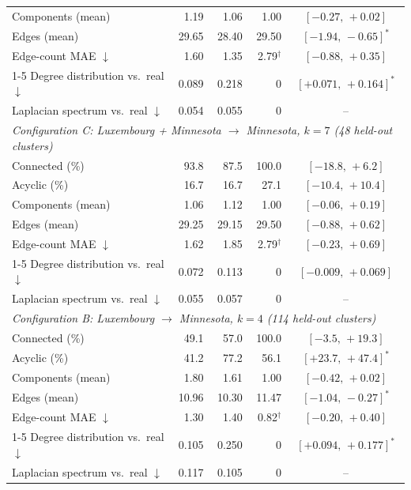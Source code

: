 \begin{table}[t]
\begin{tabular}{lrrrc}
Components (mean)                              &    1.19 &    1.06 &      1.00 & $[-0.27,\,+0.02]$ \\
Edges (mean)                                   &   29.65 &   28.40 &     29.50 & $[-1.94,\,-0.65]^\ast$ \\
Edge-count MAE $\downarrow$                    &    1.60 &    1.35 & 2.79$^\dagger$ & $[-0.88,\,+0.35]$ \\
\cmidrule(lr){1-5}
Degree distribution vs.\ real $\downarrow$     &   0.089 &   0.218 &         0 & $[+0.071,\,+0.164]^\ast$ \\
Laplacian spectrum vs.\ real $\downarrow$      &   0.054 &   0.055 &         0 & -- \\
\midrule
\multicolumn{5}{l}{\emph{Configuration C: Luxembourg + Minnesota $\rightarrow$ Minnesota, $k = 7$ (48 held-out clusters)}} \\
\midrule
Connected (\%)                                 &    93.8 &    87.5 &     100.0 & $[-18.8,\,+6.2]$ \\
Acyclic (\%)                                   &    16.7 &    16.7 &      27.1 & $[-10.4,\,+10.4]$ \\
Components (mean)                              &    1.06 &    1.12 &      1.00 & $[-0.06,\,+0.19]$ \\
Edges (mean)                                   &   29.25 &   29.15 &     29.50 & $[-0.88,\,+0.62]$ \\
Edge-count MAE $\downarrow$                    &    1.62 &    1.85 & 2.79$^\dagger$ & $[-0.23,\,+0.69]$ \\
\cmidrule(lr){1-5}
Degree distribution vs.\ real $\downarrow$     &   0.072 &   0.113 &         0 & $[-0.009,\,+0.069]$ \\
Laplacian spectrum vs.\ real $\downarrow$      &   0.055 &   0.057 &         0 & -- \\
\midrule
\multicolumn{5}{l}{\emph{Configuration B: Luxembourg $\rightarrow$ Minnesota, $k = 4$ (114 held-out clusters)}} \\
\midrule
Connected (\%)                                 &    49.1 &    57.0 &     100.0 & $[-3.5,\,+19.3]$ \\
Acyclic (\%)                                   &    41.2 &    77.2 &      56.1 & $[+23.7,\,+47.4]^\ast$ \\
Components (mean)                              &    1.80 &    1.61 &      1.00 & $[-0.42,\,+0.02]$ \\
Edges (mean)                                   &   10.96 &   10.30 &     11.47 & $[-1.04,\,-0.27]^\ast$ \\
Edge-count MAE $\downarrow$                    &    1.30 &    1.40 & 0.82$^\dagger$ & $[-0.20,\,+0.40]$ \\
\cmidrule(lr){1-5}
Degree distribution vs.\ real $\downarrow$     &   0.105 &   0.250 &         0 & $[+0.094,\,+0.177]^\ast$ \\
Laplacian spectrum vs.\ real $\downarrow$      &   0.117 &   0.105 &         0 & -- \\
\bottomrule
\end{tabular}
\end{table}



